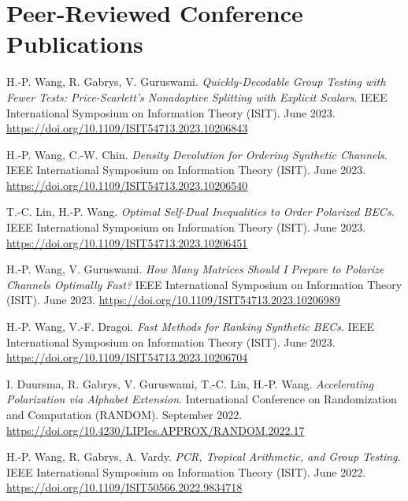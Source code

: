 \documentclass{article}
\begin{document}
\section{Peer-Reviewed Conference Publications}

\bgroup
\def\section#1#2{}
\begin{thebibliography}{9}
    \bibitem{}
    H.-P. Wang, R. Gabrys, V. Guruswami.
    \emph{Quickly-Decodable Group Testing with Fewer Tests:
    Price-Scarlett's Nonadaptive Splitting with Explicit Scalars}.
    IEEE International Symposium on Information Theory (ISIT).
    June 2023.
    \url{https://doi.org/10.1109/ISIT54713.2023.10206843}

    \bibitem{}
    H.-P. Wang, C.-W. Chin.
    \emph{Density Devolution for Ordering Synthetic Channels}.
    IEEE International Symposium on Information Theory (ISIT).
    June 2023.
    \url{https://doi.org/10.1109/ISIT54713.2023.10206540}

    \bibitem{}
    T.-C. Lin, H.-P. Wang.
    \emph{Optimal Self-Dual Inequalities to Order Polarized BECs}.
    IEEE International Symposium on Information Theory (ISIT).
    June 2023.
    \url{https://doi.org/10.1109/ISIT54713.2023.10206451}
    
    \bibitem{}
    H.-P. Wang, V. Guruswami.
    \emph{How Many Matrices Should I Prepare to Polarize Channels
    Optimally Fast?}
    IEEE International Symposium on Information Theory (ISIT).
    June 2023.
    \url{https://doi.org/10.1109/ISIT54713.2023.10206989}

    \bibitem{}
    H.-P. Wang, V.-F. Dragoi.
    \emph{Fast Methods for Ranking Synthetic BECs}.
    IEEE International Symposium on Information Theory (ISIT).
    June 2023.
    \url{https://doi.org/10.1109/ISIT54713.2023.10206704}

    \bibitem{}
    I. Duursma, R. Gabrys, V. Guruswami, T.-C. Lin, H.-P. Wang.
    \emph{Accelerating Polarization via Alphabet Extension}.
    International Conference on Randomization and Computation (RANDOM).
    September 2022.
    \url{https://doi.org/10.4230/LIPIcs.APPROX/RANDOM.2022.17}

    \bibitem{}
    H.-P. Wang, R. Gabrys, A. Vardy.
    \emph{PCR, Tropical Arithmetic, and Group Testing}.
    IEEE International Symposium on Information Theory (ISIT).
    June 2022.
\url{https://doi.org/10.1109/ISIT50566.2022.9834718}
\end{thebibliography}
\egroup
\end{document}
